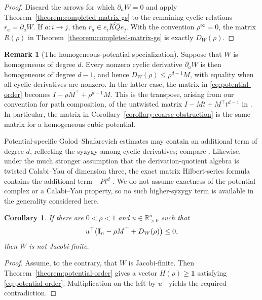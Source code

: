 \documentclass[11pt,letterpaper,reqno]{amsart}
\newtheorem{corollary}[corollary]{Corollary}
\theoremstyle{definition}
\newtheorem{remark}[remark]{Remark}
\newcommand{\one}{\mathbf 1}
\newcommand{\widehatKQ}{\widehat{KQ}}
\begin{document}
	\begin{proof}
		Discard the arrows for which $\partial_aW=0$ and apply
		Theorem~\ref{theorem:completed-matrix-gs} to the remaining cyclic
		relations $r_a=\partial_aW$.  If $a:i\to j$, then
		$r_a\in e_i\widehatKQ e_j$.  With the convention $\rho^\infty=0$, the matrix $R(\rho)$ in
		Theorem~\ref{theorem:completed-matrix-gs} is exactly $D_W(\rho)$.
	\end{proof}
	
	\begin{remark}[The homogeneous-potential specialization]
		Suppose that $W$ is homogeneous of degree $d$.  Every nonzero cyclic
		derivative $\partial_aW$ is then homogeneous of degree $d-1$, and hence $D_W(\rho)\leq \rho^{d-1}M$, with equality when all cyclic derivatives are nonzero.  In the latter case,
		the matrix in \eqref{eq:potential-order} becomes $I-\rho M^{\top}+\rho^{d-1}M$. This is the transpose, arising from our convention for path composition, of
		the untwisted matrix $I-Mt+M^{\top}t^{d-1}$ in \cite[Corollary~3.6]{GaddisRogalski}.  In particular, the matrix in
		Corollary~\ref{corollary:coarse-obstruction} is the same matrix for a
		homogeneous cubic potential.
		
		Potential-specific Golod--Shafarevich estimates may contain an additional
		term of degree $d$, reflecting the syzygy among cyclic derivatives; compare
		\cite{IyuduSmoktunowicz,IyuduShkarin}.  Likewise, under the much stronger
		assumption that the derivation-quotient algebra is twisted Calabi--Yau of
		dimension three, the exact matrix Hilbert-series formula contains the
		additional term $-Pt^d$
		\cite[Theorem~3.1]{GaddisRogalski}.  We do not assume exactness of the
		potential complex or a Calabi--Yau property, so no such higher-syzygy term is
		available in the generality considered here.
	\end{remark}
	
	\begin{corollary}
		\label{corollary:potential-order-obstruction}
		If there are $0<\rho<1$ and $u\in\mathbb R_{>0}^{n}$ such that
		\[
		u^{\top}
		\bigl({\bf I}_{n}-\rho M^{\top}+D_W(\rho)\bigr)\leq0,
		\]
		then $W$ is not Jacobi-finite.
	\end{corollary}
	
	\begin{proof}
		Assume, to the contrary, that $W$ is Jacobi-finite.  Then
		Theorem~\ref{theorem:potential-order} gives a vector $H(\rho)\geq\one$ satisfying
		\eqref{eq:potential-order}.  Multiplication on the left by $u^{\top}$
		yields the required contradiction.
	\end{proof}
	
\end{document}
